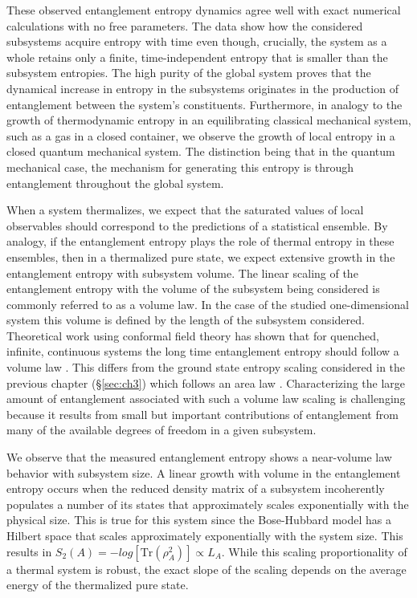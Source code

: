 These observed entanglement entropy dynamics agree well with exact numerical calculations with no free parameters. The data show how the considered subsystems acquire entropy with time even though, crucially, the system as a whole retains only a finite, time-independent entropy that is smaller than the subsystem entropies. The high purity of the global system proves that the dynamical increase in entropy in the subsystems originates in the production of entanglement between the system's constituents. Furthermore, in analogy to the growth of thermodynamic entropy in an equilibrating classical mechanical system, such as a gas in a closed container, we observe the growth of local entropy in a closed quantum mechanical system. The distinction being that in the quantum mechanical case, the mechanism for generating this entropy is through entanglement throughout the global system.

When a system thermalizes, we expect that the saturated values of local observables should correspond to the predictions of a statistical ensemble.  By analogy, if the entanglement entropy plays the role of thermal entropy in these ensembles, then in a thermalized pure state, we expect extensive growth in the entanglement entropy with subsystem volume. The linear scaling of the entanglement entropy with the volume of the subsystem being considered is commonly referred to as a volume law. In the case of the studied one-dimensional system this volume is defined by the length of the subsystem considered. Theoretical work using conformal field theory has shown that for quenched, infinite, continuous systems the long time entanglement entropy should follow a volume law \cite{Calabrese2004,Calabrese2005,Eisert2010}. This differs from the ground state entropy scaling considered in the previous chapter (\S \ref{sec:ch3}) which follows an area law \cite{Vidal2003,Calabrese2004,Calabrese2005,Eisert2010}. Characterizing the large amount of entanglement associated with such a volume law scaling is challenging because it results from  small but important contributions of entanglement from many of the available degrees of freedom in a given subsystem.

We observe that the measured entanglement entropy shows a near-volume law behavior with subsystem size. A linear growth with volume in the entanglement entropy occurs when the reduced density matrix of a subsystem incoherently populates a number of its states that approximately scales exponentially with the physical size. This is true for this system since the Bose-Hubbard model has a Hilbert space that scales approximately exponentially with the system size. This results in $S_2(A) = -log[\mathrm{Tr}(\rho_A^2)] \propto L_A$. While this scaling proportionality of a thermal system is robust, the exact slope of the scaling depends on the average energy of the thermalized pure state\cite{Vidmar2017,Garrison2018}.  


